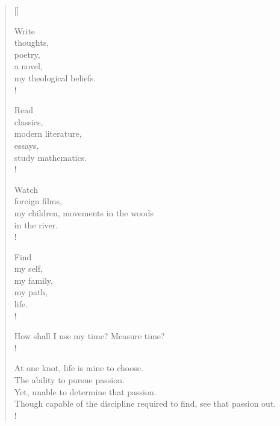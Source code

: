 \documentclass[11pt, a4paper]{article}
\begin{document}

\settowidth{\versewidth}{If you can} %

\begin{verse}[\versewidth]


Write \\
thoughts, \\
poetry, \\
a novel, \\
my theological beliefs. \\!


Read \\
classics, \\
modern literature, \\
essays, \\
study mathematics. \\!


Watch \\
foreign films, \\
my children,
movements in the woods \\
in the river. \\!


Find \\
my self, \\
my family, \\
my path, \\
life. \\!


How shall I use my time? Measure time? \\!


At one knot, life is mine to choose. \\ 
The ability to pursue passion. \\ 
Yet, unable to determine that passion. \\
Though capable of the discipline required to find, 
see that passion out. \\!


\end{verse}
\end{document}
